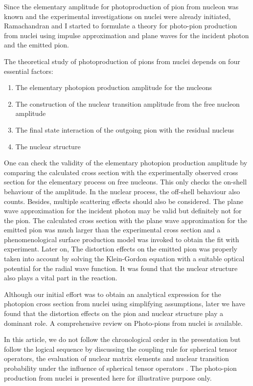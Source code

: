 Since the elementary amplitude for photoproduction of pion from nucleon was known and the experimental investigations on nuclei were already initiated, Ramachandran and I \cite{chap3-key4, chap3-key5} started to formulate a theory for photo-pion production from nuclei using impulse approximation and plane waves for the incident photon and the emitted pion.

The theoretical study of photoproduction of pions from nuclei depends on four essential factors:
\begin{enumerate}
\item The elementary photopion production amplitude for the nucleons
\item The construction of the nuclear transition amplitude from the free nucleon amplitude
\item The final state interaction of the outgoing pion with the residual nucleus
\item The nuclear structure
\end{enumerate}

One can check the validity of the elementary photopion production amplitude by comparing the calculated cross section with the experimentally observed cross section for the elementary process on free nucleons. This only checks the on-shell behaviour of the amplitude. In the nuclear process, the off-shell behaviour also counts. Besides, multiple scattering effects should also be considered. The plane wave approximation for the incident photon may be valid but definitely not for the pion. The calculated cross section with the plane wave approximation for the emitted pion was much larger than the experimental cross section and a phenomenological surface production model \cite{chap3-key19} was invoked to obtain the fit with experiment. Later on, The distortion effects on the emitted pion \cite{chap3-key20,chap3-key21} was properly taken into account by solving the Klein-Gordon equation with a suitable optical potential for the radial wave function. It was found that the nuclear structure also plays a vital part in the reaction.

Although our initial effort was to obtain an analytical expression for the photopion cross section from nuclei using simplifying assumptions, later we have found that the distortion effects on the pion and nuclear structure play a dominant role. A comprehensive review \cite{chap3-key22} on Photo-pions from nuclei is available. 

In this article, we do not follow the chronological order in the presentation but follow the logical sequence by discussing the coupling rule for spherical tensor operators, the evaluation of nuclear matrix elements and nuclear transition probability under the influence of spherical tensor operators \cite{chap3-key12}. The photo-pion production from nuclei is presented here for illustrative purpose only.

